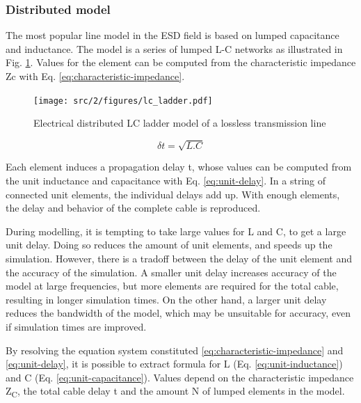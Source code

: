 \subsubsection{Distributed model}

The most popular line model in the ESD field is based on lumped capacitance and inductance.
The model is a series of lumped L-C networks as illustrated in Fig. \ref{fig:dis-line-model}.
Values for the element can be computed from the characteristic impedance \gls{Zc} with Eq. \ref{eq:characteristic-impedance}.

\begin{figure}[!h]
  \centering
  \texttt{[image: src/2/figures/lc\_ladder.pdf]}
  \caption{Electrical distributed LC ladder model of a lossless transmission line}
  \label{fig:dis-line-model}
\end{figure}

\begin{equation}
\delta t = \sqrt{L.C}
\label{eq:unit-delay}
\end{equation}

Each element induces a propagation delay \textdelta{}t, whose values can be computed from the unit inductance and capacitance with Eq. \ref{eq:unit-delay}.
In a string of connected unit elements, the individual delays add up.
With enough elements, the delay and behavior of the complete cable is reproduced.

During modelling, it is tempting to take large values for \textdelta{}L and \textdelta{}C, to get a large unit delay.
Doing so reduces the amount of unit elements, and speeds up the simulation.
However, there is a tradoff between the delay of the unit element and the accuracy of the simulation.
A smaller unit delay increases accuracy of the model at large frequencies, but more elements are required for the total cable, resulting in longer simulation times.
On the other hand, a larger unit delay reduces the bandwidth of the model, which may be unsuitable for accuracy, even if simulation times are improved.

By resolving the equation system constituted \ref{eq:characteristic-impedance} and \ref{eq:unit-delay}, it is possible to extract formula for L (Eq. \ref{eq:unit-inductance}) and C (Eq. \ref{eq:unit-capacitance}).
Values depend on the characteristic impedance Z\textsubscript{C}, the total cable delay \textDelta{}t and the amount N of lumped elements in the model.

